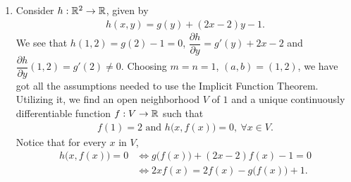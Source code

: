 \begin{problem}
\begin{solution}
\begin{enumerate}
    \begin{align*}
        f'(g(x)) g'(x) = I,\ \forall x\in \mathcal{V}.
    \end{align*}
    Therefore $g'(x) = \big[f'(g(x))\big]^{-1},\ \forall x\in \mathcal{V}$.
\item[(d)] Consider $h:\mathbb{R}^2 \rightarrow \mathbb{R}$, given by 
\begin{align*}
    h(x,y) = g(y) + (2x-2)y -1.
\end{align*}
We see that $h(1,2) = g(2) -1 = 0$, $\dfrac{\partial h}{\partial y} = g'(y) + 2x-2$ and $\dfrac{\partial h}{\partial y}(1,2) = g'(2) \ne 0$. Choosing $m=n=1$, $(a,b)=(1,2)$, we have got all the assumptions needed to use the Implicit Function Theorem. Utilizing it, we find an open neighborhood $V$ of $1$ and a unique continuously differentiable function $f:V\rightarrow\mathbb{R}$ such that 
\begin{align*}
    f(1)=2 \text{ and } h\big( x, f(x) \big) =0,\ \forall x\in V. 
\end{align*}
Notice that for every $x$ in $V$,
\begin{align*}
    h\big( x,f(x) \big) = 0 &\iff g\big( f(x) \big) + (2x-2)f(x) -1 = 0 \\
    &\iff 2xf(x) = 2f(x) -g\big( f(x) \big) +1.
\end{align*}
\end{enumerate}
\end{solution}
\end{problem}
